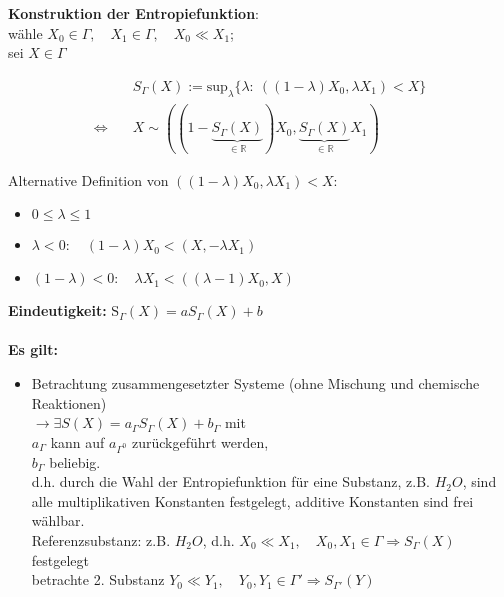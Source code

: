 \documentclass[10pt,article,colorback,accentcolor=tud9d]{scrartcl}
\begin{document}
\textbf{Konstruktion der Entropiefunktion}:\\
wähle $X_0 \in \Gamma, \quad X_1 \in \Gamma, \quad X_0 \ll X_1$;\\
sei $X \in \Gamma$
\begin{fleqn}
\begin{equation}
\begin{aligned}
\quad &S_\Gamma(X) :=\text{sup}_\lambda \{\lambda: \ ((1-\lambda)X_0,\lambda X_1) < X\}\\
\Leftrightarrow \quad &X \sim ((1-\underbrace{S_\Gamma(X)}_{\in \mathbb{R}})X_0,\underbrace{S_\Gamma(X)}_{\in \mathbb{R}}X_1)
\end{aligned}
\end{equation}
\end{fleqn}
Alternative Definition von $((1-\lambda)X_0,\lambda X_1)<X$:\\
\begin{itemize}
\item $0 \leq \lambda \leq 1$
\item $\lambda < 0: \quad (1-\lambda)X_0<(X,-\lambda X_1)$
\item $(1-\lambda)<0: \quad \lambda X_1<((\lambda-1)X_0,X)$
\end{itemize} 
\textbf{Eindeutigkeit:} $\text{\~{S}}_\Gamma(X)=aS_\Gamma(X)+b$\\ \\
\textbf{Es gilt:}
\begin{itemize}
\item Betrachtung zusammengesetzter Systeme (ohne Mischung und chemische Reaktionen)\\
$\rightarrow \exists S(X) = a_\Gamma S_\Gamma(X) + b_\Gamma$ mit\\ 
$a_\Gamma$ kann auf $a_{\Gamma^0}$ zurückgeführt werden,\\ 
$b_\Gamma$ beliebig.\\
d.h. durch die Wahl der Entropiefunktion für eine Substanz, z.B. $H_2O$, sind alle multiplikativen Konstanten festgelegt, additive Konstanten sind frei wählbar.\\
Referenzsubstanz: z.B. $H_2O$, d.h. $X_0 \ll X_1, \quad X_0,X_1 \in \Gamma \Rightarrow S_\Gamma(X)$ festgelegt\\
betrachte 2. Substanz $Y_0 \ll Y_1, \quad Y_0,Y_1 \in \Gamma' \Rightarrow S_{\Gamma'}(Y)$
\end{itemize}
\end{document}
